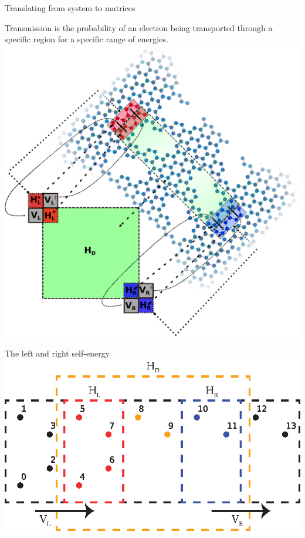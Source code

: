 \documentclass[hyperref={colorlinks=true,urlcolor=blue,linkcolor=.},aspectratio=1610,mathserif]{beamer}
\newcommand{\im}[3]{\inputminted[linenos=true, python3=true, firstline=#2, lastline=#3]{python}{#1}}
\begin{document}
\begin{frame}{Translating from system to matrices}
\centering
\begin{overprint}
		    Transmission is the probability of an electron being transported through a specific region for a specific range of energies.
			\includegraphics[width=\textwidth]{Figures/illu.eps}
\end{overprint}
\end{frame}

\begin{frame}{The left and right self-energy}
    \centering
   \includegraphics[width=.9\textwidth]{Figures/2DHam.eps}
    \im{Listings/Functions.py}{210}{212}
\end{frame}
\end{document}
